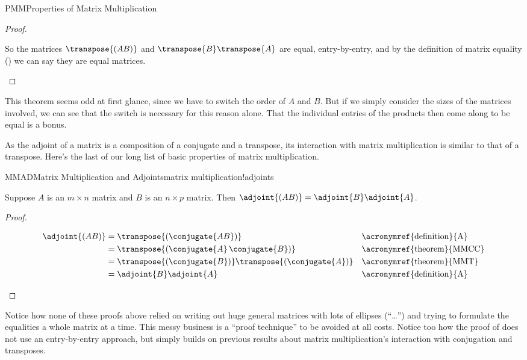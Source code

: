 \begin{subsect}{PMM}{Properties of Matrix Multiplication}
\begin{proof}
\begin{para}
\end{para}
%
\begin{para}So the matrices $\transpose{(AB)}$ and $\transpose{B}\transpose{A}$ are equal, entry-by-entry, and by the definition of matrix equality () we can say they are equal matrices.\end{para}
%
\end{proof}
%
\begin{para}This theorem seems odd at first glance, since we have to switch the order of $A$ and $B$.  But if we simply consider the sizes of the matrices involved, we can see that the switch is necessary for this reason alone.  That the individual entries of the products then come along to be equal is a bonus.\end{para}
%
\begin{para}As the adjoint of a matrix is a composition of a conjugate and a transpose, its interaction with matrix multiplication is similar to that of a transpose.  Here's the last of our long list of basic properties of matrix multiplication.\end{para}
%
\begin{theorem}{MMAD}{Matrix Multiplication and Adjoints}{matrix multiplication!adjoints}
\begin{para}Suppose $A$ is an $m\times n$ matrix and $B$ is an $n\times p$ matrix.  Then $\adjoint{(AB)}=\adjoint{B}\adjoint{A}$.\end{para}
\end{theorem}
%
\begin{proof}
%
\begin{para}
\begin{align*}
\adjoint{(AB)}
&=\transpose{\left(\conjugate{AB}\right)}&&\text{\acronymref{definition}{A}}\\
&=\transpose{\left(\conjugate{A}\,\conjugate{B}\right)}&&\text{\acronymref{theorem}{MMCC}}\\
&=\transpose{\left(\conjugate{B}\right)}\transpose{\left(\conjugate{A}\right)}&&\text{\acronymref{theorem}{MMT}}\\
&=\adjoint{B}\adjoint{A}&&\text{\acronymref{definition}{A}}
\end{align*}
\end{para}
%
\end{proof}
%
\begin{para}Notice how none of these proofs above relied on writing out huge general matrices with lots of ellipses (``\dots'') and trying to formulate the equalities a whole matrix at a time.  This messy business is a ``proof technique'' to be avoided at all costs.  Notice too how the proof of  does not use an entry-by-entry approach, but simply builds on previous results about matrix multiplication's interaction with conjugation and transposes.\end{para}

\end{subsect}
